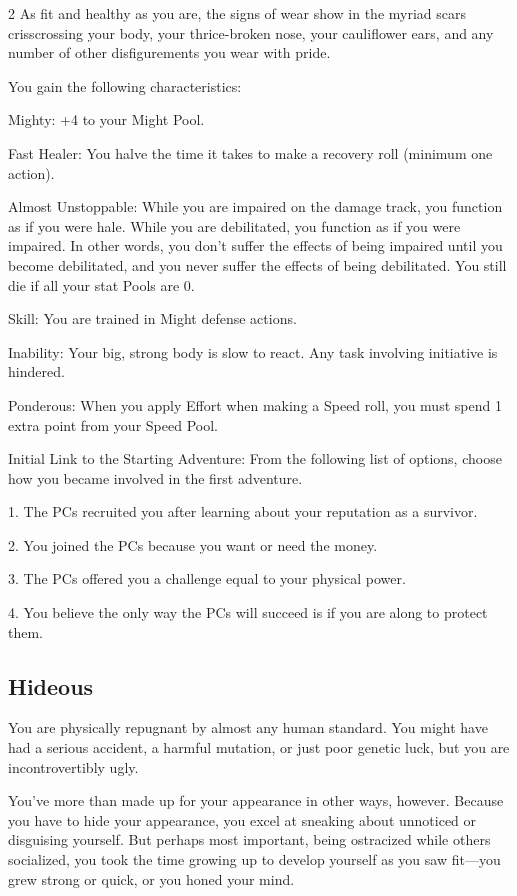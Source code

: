 \begin{multicols}{2}
As fit and healthy as you are, the signs of wear show in the myriad scars crisscrossing your body, your thrice-broken nose, your cauliflower ears, and any number of other disfigurements you wear with pride.

You gain the following characteristics:

Mighty: +4 to your Might Pool.

Fast Healer: You halve the time it takes to make a recovery roll (minimum one action).

Almost Unstoppable: While you are impaired on the damage track, you function as if you were hale. While you are debilitated, you function as if you were impaired. In other words, you don’t suffer the effects of being impaired until you become debilitated, and you never suffer the effects of being debilitated. You still die if all your stat Pools are 0.

Skill: You are trained in Might defense actions.

Inability: Your big, strong body is slow to react. Any task involving initiative is hindered.

Ponderous: When you apply Effort when making a Speed roll, you must spend 1 extra point from your Speed Pool.

Initial Link to the Starting Adventure: From the following list of options, choose how you became involved in the first adventure.

1. The PCs recruited you after learning about your reputation as a survivor.

2. You joined the PCs because you want or need the money.

3. The PCs offered you a challenge equal to your physical power.

4. You believe the only way the PCs will succeed is if you are along to protect them.

\subsection{Hideous}

You are physically repugnant by almost any human standard. You might have had a serious accident, a harmful mutation, or just poor genetic luck, but you are incontrovertibly ugly.

You’ve more than made up for your appearance in other ways, however. Because you have to hide your appearance, you excel at sneaking about unnoticed or disguising yourself. But perhaps most important, being ostracized while others socialized, you took the time growing up to develop yourself as you saw fit—you grew strong or quick, or you honed your mind.


\end{multicols}
